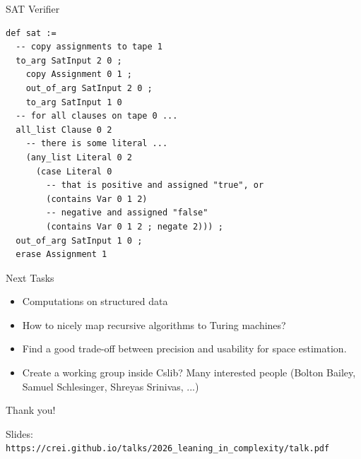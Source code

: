 \documentclass{beamer}
\begin{document}
\begin{frame}[fragile]{SAT Verifier}
  \begin{lstlisting}
def sat :=
  -- copy assignments to tape 1
  to_arg SatInput 2 0 ;
    copy Assignment 0 1 ;
    out_of_arg SatInput 2 0 ;
    to_arg SatInput 1 0
  -- for all clauses on tape 0 ...
  all_list Clause 0 2
    -- there is some literal ...
    (any_list Literal 0 2
      (case Literal 0
        -- that is positive and assigned "true", or
        (contains Var 0 1 2)
        -- negative and assigned "false"
        (contains Var 0 1 2 ; negate 2))) ;
  out_of_arg SatInput 1 0 ;
  erase Assignment 1
\end{lstlisting}
\end{frame}

\begin{frame}{Next Tasks}
  \begin{itemize}
    \item Computations on structured data
    \item How to nicely map recursive algorithms to Turing machines?
    \item Find a good trade-off between precision and usability for space estimation.
    \item Create a working group inside Cslib? Many interested people (Bolton Bailey, Samuel Schlesinger,  Shreyas Srinivas, ...)
  \end{itemize}
\end{frame}

\begin{frame}{}

  \begin{center}
    \Large Thank you!
  \end{center}

  \medskip

  {\footnotesize
  Slides:\\\texttt{https://crei.github.io/talks/2026\_leaning\_in\_complexity/talk.pdf}
  }
\end{frame}

\end{document}
